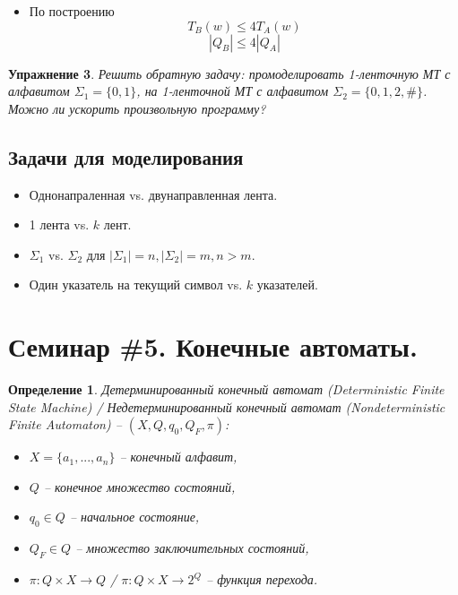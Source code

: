 \documentclass[a4paper, 12pt]{extarticle}
\newtheorem*{definition}{Определение}
\newtheorem*{homework}{Упражнение}
\begin{document}
\begin{itemize}
  \begin{homework}
    Доказать, что $decode(v') = w', n' = 2 * k', \hat{q} = q'$. Рассмотреть случай $k' = -1$.
  \end{homework}
 
 \begin{homework}
    Доказать, что $\phi_A = \phi_B$. Рассмотреть случай зацикливания $A$.
  \end{homework}
   
  \item По построению 
  $$T_B(w) \leq 4 T_A(w)$$
  $$|Q_B| \leq 4 |Q_A| $$
\end{itemize}

\begin{homework}
Решить обратную задачу: промоделировать 1-ленточную МТ с алфавитом $\Sigma_1 = \{0, 1\}$, на 1-ленточной МТ с алфавитом $\Sigma_2 = \{0, 1, 2, \#\}$.
Можно ли ускорить произвольную программу?
\end{homework}

\subsection*{Задачи для моделирования}
\begin{itemize}
 \item Однонапраленная vs. двунаправленная лента.
 \item 1 лента vs. $k$ лент.
 \item $\Sigma_1$ vs. $\Sigma_2$ для $|\Sigma_1| = n, |\Sigma_2| = m, n > m$.
 \item Один указатель на текущий символ vs. $k$ указателей. 
\end{itemize}

\newpage
\section*{Семинар \#5. Конечные автоматы.}

\begin{definition}
Детерминированный конечный автомат (Deterministic Finite State Machine) / Недетерминированный конечный автомат (Nondeterministic Finite Automaton) -- 
$(X, Q, q_0, Q_F, \pi)$:
\begin{itemize}
 \item $X = \{a_1, ..., a_n\}$ -- конечный алфавит,
 \item $Q$ –  конечное множество состояний,
 \item $q_0\in Q$ – начальное состояние,
 \item $Q_F \in Q$ – множество заключительных состояний, 
 \item $\pi : Q \times X \rightarrow Q$ / $\pi : Q \times X \rightarrow 2^Q$ -- функция перехода.
\end{itemize}
\end{definition}
\end{document}
